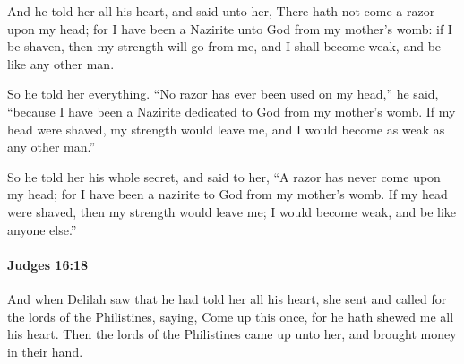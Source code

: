 			\begin{versebox}
					\item[BHS] 
					\item[ASV] And he told her all his heart, and said unto her, There hath not come a razor upon my head; for I have been a Nazirite unto God from my mother's womb: if I be shaven, then my strength will go from me, and I shall become weak, and be like any other man.
					\item[NIV] So he told her everything. “No razor has ever been used on my head,” he said, “because I have been a Nazirite dedicated to God from my mother’s womb. If my head were shaved, my strength would leave me, and I would become as weak as any other man.”
					\item[NRSV] So he told her his whole secret, and said to her, “A razor has never come upon my head; for I have been a nazirite to God from my mother’s womb. If my head were shaved, then my strength would leave me; I would become weak, and be like anyone else.”
			\end{versebox}

		\paragraph{Judges 16:18} %
			\label{JUDGES-16-18}

			And when Delilah saw that he had told her all his heart, she sent and called for the lords of the Philistines, saying, Come up this once, for he hath shewed me all his heart. Then the lords of the Philistines came up unto her, and brought money in their hand.

